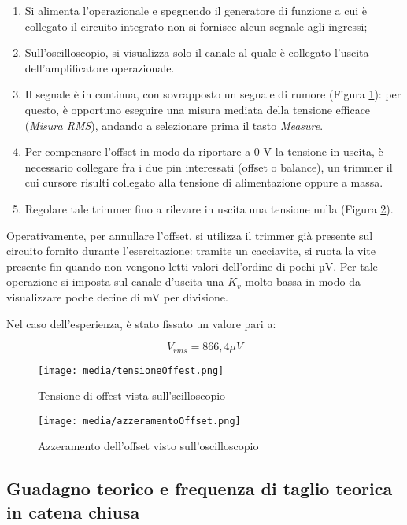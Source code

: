 \begin{enumerate}
    \item Si alimenta l'operazionale e spegnendo il generatore di funzione a cui è collegato il circuito integrato non si fornisce alcun segnale agli ingressi;
    \item  Sull’oscilloscopio, si visualizza solo il canale al quale è collegato l’uscita dell’amplificatore operazionale.
    \item  Il segnale è in continua, con sovrapposto un segnale di rumore (Figura \ref{fig:tensioneOffset}): per questo, è opportuno eseguire una misura mediata della tensione efficace (\textit{Misura RMS}), andando a selezionare prima il tasto \textit{Measure}.
    \item  Per compensare l’offset in modo da riportare a 0 V la tensione in uscita, è necessario collegare fra i due pin interessati (offset o balance), un trimmer il cui cursore risulti collegato alla tensione di alimentazione oppure a massa.
    \item Regolare tale trimmer fino a rilevare in uscita una tensione nulla (Figura \ref{fig:azzeramentoOffset}). 
\end{enumerate}

Operativamente, per annullare l’offset, si utilizza il trimmer già presente sul circuito fornito durante l’esercitazione: tramite un cacciavite, si ruota la vite presente fin quando non vengono letti valori dell’ordine di pochi µV.  Per tale operazione si imposta  sul canale d'uscita una  $K_v$ molto bassa in modo da visualizzare  poche decine di mV per divisione.
  
Nel caso dell'esperienza, è stato fissato un valore pari a:

\[V_{rms}=866,4 \mu V\]
\FloatBarrier
\begin{figure}
    \centering
    \texttt{[image: media/tensioneOffest.png]}
    \caption{Tensione di offest vista sull'scilloscopio}
    \label{fig:tensioneOffset}
\end{figure}
\begin{figure}
    \centering
    \texttt{[image: media/azzeramentoOffset.png]}
    \caption{Azzeramento dell'offset visto sull'oscilloscopio}
    \label{fig:azzeramentoOffset}
\end{figure}
\FloatBarrier

\subsection{Guadagno teorico e frequenza di taglio teorica in catena chiusa}

